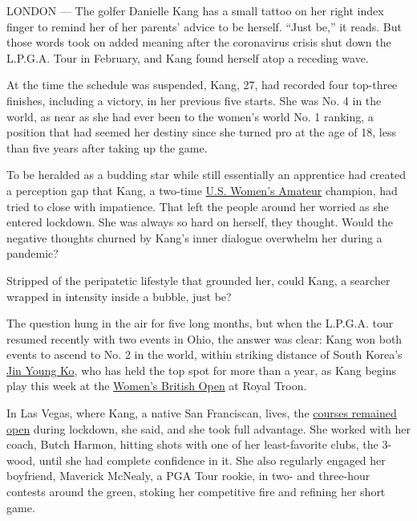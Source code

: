 LONDON --- The golfer Danielle Kang has a small tattoo on her right
index finger to remind her of her parents' advice to be herself. ``Just
be,'' it reads. But those words took on added meaning after the
coronavirus crisis shut down the L.P.G.A. Tour in February, and Kang
found herself atop a receding wave.

At the time the schedule was suspended, Kang, 27, had recorded four
top-three finishes, including a victory, in her previous five starts.
She was No. 4 in the world, as near as she had ever been to the women's
world No. 1 ranking, a position that had seemed her destiny since she
turned pro at the age of 18, less than five years after taking up the
game.

To be heralded as a budding star while still essentially an apprentice
had created a perception gap that Kang, a two-time
\href{https://www.nytimes3xbfgragh.onion/2020/08/09/sports/golf/womens-amateur-gabi-ruffels.html}{U.S.
Women's Amateur} champion, had tried to close with impatience. That left
the people around her worried as she entered lockdown. She was always so
hard on herself, they thought. Would the negative thoughts churned by
Kang's inner dialogue overwhelm her during a pandemic?

Stripped of the peripatetic lifestyle that grounded her, could Kang, a
searcher wrapped in intensity inside a bubble, just be?

The question hung in the air for five long months, but when the L.P.G.A.
tour resumed recently with two events in Ohio, the answer was clear:
Kang won both events to ascend to No. 2 in the world, within striking
distance of South Korea's
\href{https://www.nytimes3xbfgragh.onion/2019/08/29/sports/golf/jin-young-ko-bogey-lpga.html}{Jin
Young Ko}, who has held the top spot for more than a year, as Kang
begins play this week at the
\href{https://www.nytimes3xbfgragh.onion/2020/07/07/sports/golf/womens-british-open-spectators-lpga.html}{Women's
British Open} at Royal Troon.

In Las Vegas, where Kang, a native San Franciscan, lives, the
\href{https://www.reviewjournal.com/sports/golf/some-locals-upset-golf-courses-stay-open-during-pandemic-2002223/}{courses
remained open} during lockdown, she said, and she took full advantage.
She worked with her coach, Butch Harmon, hitting shots with one of her
least-favorite clubs, the 3-wood, until she had complete confidence in
it. She also regularly engaged her boyfriend, Maverick McNealy, a PGA
Tour rookie, in two- and three-hour contests around the green, stoking
her competitive fire and refining her short game.

